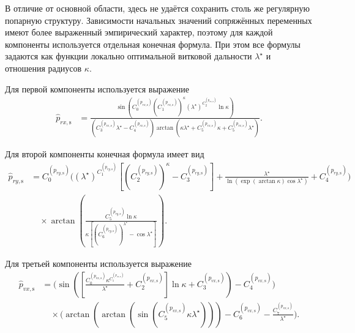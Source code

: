 В отличие от основной области, здесь не удаётся сохранить столь же регулярную попарную структуру. Зависимости начальных значений сопряжённых переменных имеют более выраженный эмпирический характер, поэтому для каждой компоненты используется отдельная конечная формула. При этом все формулы задаются как функции локально оптимальной витковой дальности $\lambda^\star$ и отношения радиусов $\kappa$.

Для первой компоненты используется выражение
\begin{equation}
	\begin{aligned}
		\widehat{p}_{rx,\mathrm{s}}
		&=
		\frac{
			\sin\!\left(
			C_0^{(p_{rx,\mathrm{s}})}
			\left(C_1^{(p_{rx,\mathrm{s}})}\right)^{\kappa}
			\left(\lambda^\star\right)^{C_2^{(p_{rx,\mathrm{s}})}}
			\ln\kappa
			\right)
		}{
			\left(C_3^{(p_{rx,\mathrm{s}})}\lambda^\star-C_4^{(p_{rx,\mathrm{s}})}\right)
			\arctan\!\left(
			\kappa\lambda^\star
			+
			C_5^{(p_{rx,\mathrm{s}})}\kappa
			+
			C_5^{(p_{rx,\mathrm{s}})}\lambda^\star
			\right)
		}.
	\end{aligned}
\end{equation}

Для второй компоненты конечная формула имеет вид
\begin{equation}
	\begin{aligned}
		\widehat{p}_{ry,\mathrm{s}}
		&=
		C_0^{(p_{ry,\mathrm{s}})}
		\Bigg(
		\left(\lambda^\star\right)^{C_1^{(p_{ry,\mathrm{s}})}}
		\left[
		\left(C_2^{(p_{ry,\mathrm{s}})}\right)^\kappa
		-
		C_3^{(p_{ry,\mathrm{s}})}
		\right]
		+
		\frac{\lambda^\star}{
			\ln\!\left(
			\exp\!\left(\arctan\kappa\right)
			\cos\lambda^\star
			\right)
		}
		+
		C_4^{(p_{ry,\mathrm{s}})}
		\Bigg)
		\\
		&\quad {}\times
		\arctan\!\left(
		\frac{
			C_5^{(p_{ry,\mathrm{s}})}\ln\kappa
		}{
			\kappa
			\left[
			\left(C_6^{(p_{ry,\mathrm{s}})}\right)^{\lambda^\star}
			-
			\cos\lambda^\star
			\right]
		}
		\right).
	\end{aligned}
\end{equation}

Для третьей компоненты используется выражение
\begin{equation}
	\begin{aligned}
		\widehat{p}_{vx,\mathrm{s}}
		&=
		\Bigg(
		\sin\!\left(
		\left[
		\frac{
			C_0^{(p_{vx,\mathrm{s}})}\kappa^{C_1^{(p_{vx,\mathrm{s}})}}
		}{
			\lambda^\star
		}
		+
		C_2^{(p_{vx,\mathrm{s}})}
		\right]
		\ln\kappa
		+
		C_3^{(p_{vx,\mathrm{s}})}
		\right)
		-
		C_4^{(p_{vx,\mathrm{s}})}
		\Bigg)
		\\
		&\quad {}\times
		\Bigg(
		\arctan\!\left(
		\arctan\!\left(
		\sin\!\left(
		C_5^{(p_{vx,\mathrm{s}})}\kappa\lambda^\star
		\right)
		\right)
		\right)
		-
		C_6^{(p_{vx,\mathrm{s}})}
		-
		\frac{C_7^{(p_{vx,\mathrm{s}})}}{\lambda^\star}
		\Bigg).
	\end{aligned}
\end{equation}

